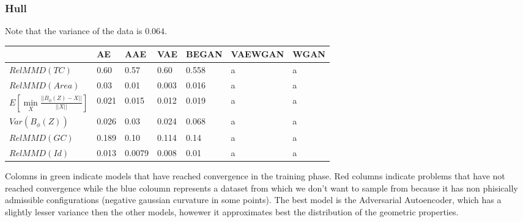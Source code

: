 \documentclass{article}
\begin{document}
\subsubsection{Hull}
Note that the variance of the data is $0.064$.
\begin{table}[H]
\begin{tabular}{|l|l|l|l|l|l|l|}
\hline
&  \cellcolor{green!30} AE & \cellcolor{green!30} AAE & \cellcolor{green!30} VAE & \cellcolor{green!30} BEGAN & \cellcolor{red!30} VAEWGAN & \cellcolor{red!30} WGAN  \\ \hline
$RelMMD(TC)$ & \cellcolor{green!30} 0.60 & \cellcolor{green!30} 0.57  & \cellcolor{green!30} 0.60 & \cellcolor{green!30}  0.558 & \cellcolor{red!30} a & \cellcolor{red!30} a \\ \hline
$RelMMD(Area)$  & \cellcolor{green!30} 0.03 & \cellcolor{green!30} 0.01 & \cellcolor{green!30} 0.003 & \cellcolor{green!30} 0.016 & \cellcolor{red!30} a &   \cellcolor{red!30} a \\ \hline
$E[\min\limits_{X} \frac{||B_{\phi}(Z)-X||}{||X||}]$& \cellcolor{green!30} 0.021 & \cellcolor{green!30} 0.015 & \cellcolor{green!30} 0.012 & \cellcolor{green!30} 0.019 & \cellcolor{red!30} a& \cellcolor{red!30} a  \\ \hline
$Var(B_{\phi}(Z))$& \cellcolor{green!30} 0.026 & \cellcolor{green!30}  0.03 & \cellcolor{green!30} 0.024 & \cellcolor{green!30} 0.068 &  \cellcolor{red!30} a & \cellcolor{red!30} a \\ \hline
$RelMMD(GC)$ & \cellcolor{green!30} 0.189 & \cellcolor{green!30} 0.10 & \cellcolor{green!30} 0.114 & \cellcolor{green!30} 0.14 & \cellcolor{red!30} a & \cellcolor{red!30} a \\ \hline
$RelMMD(Id)$ & \cellcolor{green!30} 0.013 & \cellcolor{green!30} 0.0079 & \cellcolor{green!30} 0.008 & \cellcolor{green!30} 0.01 & \cellcolor{red!30} a & \cellcolor{red!30} a\\ \hline
\end{tabular}
\end{table}Colomns in green indicate models that have reached convergence in the training phase. Red columns indicate problems that have not reached convergence while the blue coloumn represents a dataset from which we don't want to sample from because it has non phisically admissible configurations (negative gaussian curvature in some points).
The best model is the Adversarial Autoencoder, which has a slightly lesser variance then the other models, howewer it approximates best the distribution of the geometric properties.
\begin{comment}
\subsubsection{Rabbit}
\end{comment}
\end{document}
